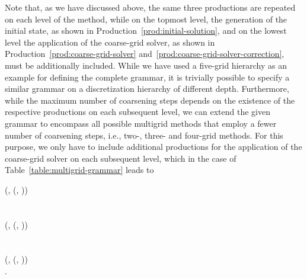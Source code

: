 Note that, as we have discussed above, the same three productions are repeated on each level of the method, while on the topmost level, the generation of the initial state, as shown in Production~\eqref{prod:initial-solution}, and on the lowest level the application of the coarse-grid solver, as shown in Production~\eqref{prod:coarse-grid-solver} and~\eqref{prod:coarse-grid-solver-correction}, must be additionally included.
While we have used a five-grid hierarchy as an example for defining the complete grammar, it is trivially possible to specify a similar grammar on a discretization hierarchy of different depth.
Furthermore, while the maximum number of coarsening steps depends on the existence of the respective productions on each subsequent level, we can extend the given grammar to encompass all possible multigrid methods that employ a fewer number of coarsening steps, i.e., two-, three- and four-grid methods.
For this purpose, we only have to include additional productions for the application of the coarse-grid solver on each subsequent level, which in the case of Table~\ref{table:multigrid-grammar} leads to
\begin{bnf*}
	 {
		(, \bnfsp {}(, \bnfsp{}))
	} \\
	 \\ \\
	 {
		(, \bnfsp {}(, \bnfsp{}))
	} \\
	 \\ \\
	 {
		(, \bnfsp {}(, \bnfsp{}))
	} \\
	.
\end{bnf*}

